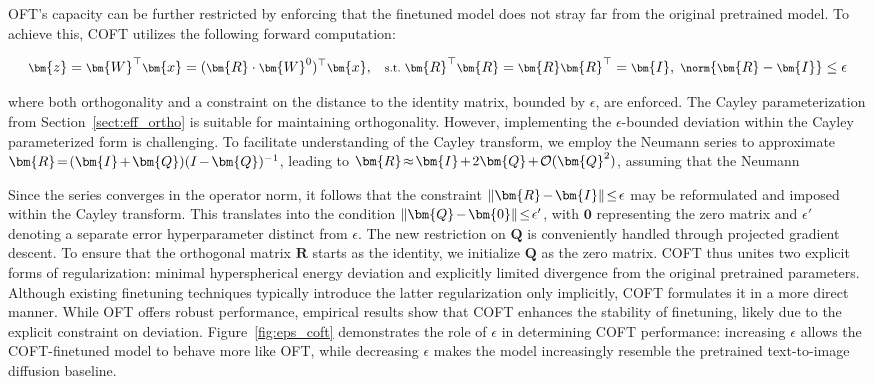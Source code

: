 OFT’s capacity can be further restricted by enforcing that the finetuned model does not stray far from the original pretrained model. To achieve this, COFT utilizes the following forward computation:

\begin{equation}\label{eq:coft_general}
    \footnotesize
    \bm{z} = \bm{W}^\top \bm{x} = (\bm{R}\cdot\bm{W}^0)^\top \bm{x},~~~\text{s.t.}~\bm{R}^\top \bm{R} = \bm{R}\bm{R}^\top = \bm{I},~\norm{\bm{R}-\bm{I}}\leq \epsilon
\end{equation}

where both orthogonality and a constraint on the distance to the identity matrix, bounded by $\epsilon$, are enforced. The Cayley parameterization from Section~\ref{sect:eff_ortho} is suitable for maintaining orthogonality. However, implementing the $\epsilon$-bounded deviation within the Cayley parameterized form is challenging. To facilitate understanding of the Cayley transform, we employ the Neumann series to approximate $\thickmuskip=2mu \medmuskip=2mu \bm{R} = (\bm{I}+\bm{Q})(I-\bm{Q})^{-1}$, leading to $\thickmuskip=2mu \medmuskip=2mu \bm{R} \approx \bm{I} + 2\bm{Q} + \mathcal{O}(\bm{Q}^2)$, assuming that the Neumann

Since the series converges in the operator norm, it follows that the constraint $\thickmuskip=2mu \medmuskip=2mu\|\bm{R}-\bm{I}\|\leq\epsilon$ may be reformulated and imposed within the Cayley transform. This translates into the condition $\thickmuskip=2mu \medmuskip=2mu\|\bm{Q}-\bm{0}\|\leq\epsilon'$, with $\bm{0}$ representing the zero matrix and $\epsilon'$ denoting a separate error hyperparameter distinct from $\epsilon$. The new restriction on $\bm{Q}$ is conveniently handled through projected gradient descent. To ensure that the orthogonal matrix $\bm{R}$ starts as the identity, we initialize $\bm{Q}$ as the zero matrix. COFT thus unites two explicit forms of regularization: minimal hyperspherical energy deviation and explicitly limited divergence from the original pretrained parameters. Although existing finetuning techniques typically introduce the latter regularization only implicitly, COFT formulates it in a more direct manner. While OFT offers robust performance, empirical results show that COFT enhances the stability of finetuning, likely due to the explicit constraint on deviation. Figure~\ref{fig:eps_coft} demonstrates the role of $\epsilon$ in determining COFT performance: increasing $\epsilon$ allows the COFT-finetuned model to behave more like OFT, while decreasing $\epsilon$ makes the model increasingly resemble the pretrained text-to-image diffusion baseline.

